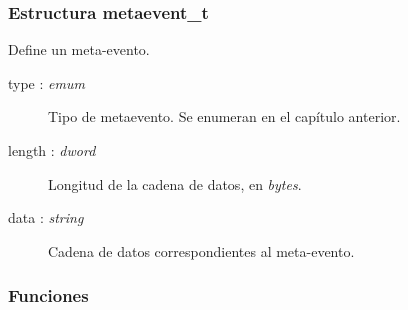 \subsubsection{Estructura metaevent\_t}

Define un meta-evento.

\begin{description}
	\item[type : \textit{emum}] Tipo de metaevento. Se enumeran en el capítulo anterior.
	\item[length : \textit{dword}] Longitud de la cadena de datos, en \textit{bytes}.
	\item[data : \textit{string}] Cadena de datos correspondientes al meta-evento.
\end{description}

\subsubsection{Funciones}

